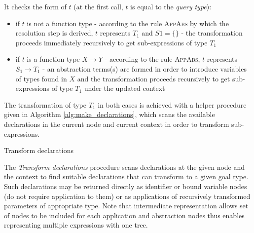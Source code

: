 It checks the form of $t$ (at the first call, $t$ is equal to the \textit{query type}):
\begin{itemize}
  \item if $t$ is not a function type - according to the rule \textsc{AppAbs} by which the resolution step is derived, $t$ represents $T_1$ and $S1= \{\}$ - the transformation proceeds immediately recursively to get sub-expressions of type $T_1$
  \item if $t$ is a function type $X \rightarrow Y$ - according to the rule \textsc{AppAbs}, $t$ represents $S_1 \rightarrow T_1$ - an abstraction terms(s) are formed in order to introduce variables of types found in $X$ and the transformation proceeds recursively to get sub-expressions of type $T_1$ under the updated context
\end{itemize}
The transformation of type $T_1$ in both cases is achieved with a helper procedure given in Algorithm \ref{alg:make_declarations}, which scans the available declarations in the current node and current context in order to transform sub-expressions.


\begin{algorithm}[ht]
\caption{Transform declarations}
\label{alg:make_declarations}
\begin{algorithmic}[1]

\ELSE
{}
\ENDFOR
\ENDFOR
{} 
\ENDIF
\ENDFOR

\end{algorithmic}
\end{algorithm}
The \textit{Transform declarations} procedure scans declarations at the given node and the context to find suitable declarations that can transform to a given goal type.
Such declarations may be returned directly as identifier or bound variable nodes (do not require application to them) or as applications of recursively transformed parameters of appropriate type.
Note that intermediate representation allows set of nodes to be included for each application and abstraction nodes thus enables representing multiple expressions with one tree.

